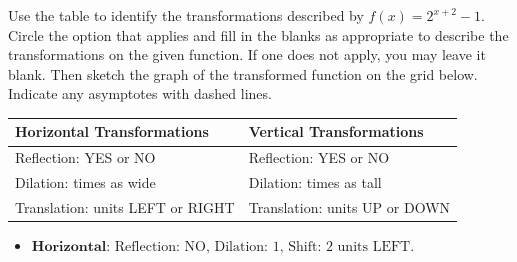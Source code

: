 \documentclass[11pt]{exam}
\begin{document}
\begin{questions}
\begin{center}
\vspace{12pt}

\end{center}
\newpage

\question [5] Use the table to identify the transformations described by \(\displaystyle{ f(x) = 2^{x + 2} - 1 }\). Circle the option that applies and fill in the blanks as appropriate to describe the transformations on the given function. If one does not apply, you may leave it blank. Then sketch the graph of the transformed function on the grid below. Indicate any asymptotes with dashed lines.\\
	\renewcommand{\arraystretch}{3} %
	\begin{center}
	\begin{tabular}{|l|l|}
		\hline
		\textbf{Horizontal Transformations}               & \textbf{Vertical Transformations}              \\ \hline
		Reflection: YES    or     NO       & Reflection:       YES    or     NO    \\ \hline
		Dilation: \underline{\hspace{2cm}} times as wide           & Dilation: \underline{\hspace{2cm}} times as tall        \\ \hline
		Translation: \underline{\hspace{2cm}} units LEFT or RIGHT & Translation: \underline{\hspace{2cm}} units UP or DOWN \\ \hline
	\end{tabular}
\end{center}
\vspace{12pt}

\begin{center}
\end{center}

\begin{solution}
\begin{itemize}
\item
 \(\textbf{Horizontal: } \text{Reflection: NO, Dilation: 1, Shift: 2 units LEFT.}\) 


\end{itemize}
\end{solution}
\end{questions}
\end{document}
